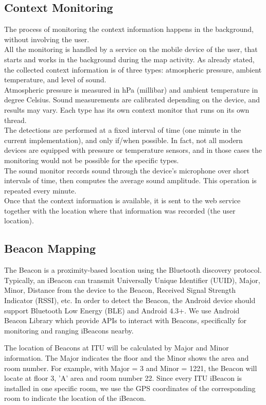\documentclass{sigchi}
\begin{document}
\subsection{Context Monitoring}
The process of monitoring the context information happens in the background, without involving the user. \\
All the monitoring is handled by a service on the mobile device of the user, that starts and works in the background during the map activity.
As already stated, the collected context information is of three types: atmospheric pressure, ambient temperature, and level of sound. \\
Atmospheric pressure is measured in hPa (millibar) and ambient temperature in degree Celsius.
Sound measurements are calibrated depending on the device, and results may vary.
Each type has its own context monitor that runs on its own thread. \\
The detections are performed at a fixed interval of time (one minute in the current implementation), and only if/when possible. In fact, not all modern devices are equipped with pressure or temperature sensors, and in those cases the monitoring would not be possible for the specific types.\\
The sound monitor records sound through the device's microphone over short intervals of time, then computes the average sound amplitude. This operation is repeated every minute. \\
Once that the context information is available, it is sent to the web service together with the location where that information was recorded (the user location).

\subsection{Beacon Mapping}
The Beacon is a proximity-based location using the Bluetooth discovery protocol.
Typically, an iBeacon can transmit Universally Unique Identifier (UUID), Major, Minor, Distance from the device to the Beacon, Received Signal Strength Indicator (RSSI), etc.
In order to detect the Beacon, the Android device should support Bluetooth Low Energy (BLE) and Android 4.3+.
We use Android Beacon Library which provide APIs to interact with Beacons, specifically for monitoring and ranging iBeacons nearby.

The location of Beacons at ITU will be calculated by Major and Minor information.
The Major indicates the floor and the Minor shows the area and room number.
For example, with Major = 3 and Minor = 1221, the Beacon will locate at floor 3, 'A' area and room number 22.
Since every ITU iBeacon is installed in one specific room, we use the GPS coordinates of the corresponding room to indicate the location of the iBeacon.
\end{document}
